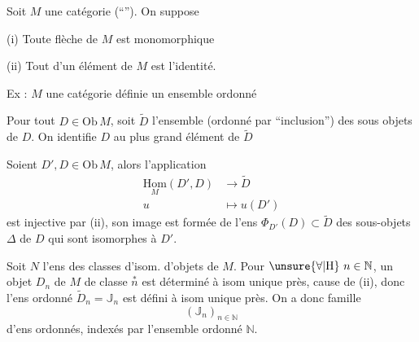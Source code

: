 
Soit \(M\) une catégorie (``''). On suppose

(i) Toute flèche de \(M\) est monomorphique

(ii) Tout  d'un élément de \(M\) est l'identité.

Ex : \(M\) une catégorie définie  un ensemble ordonné

Pour tout \(D\in\mathrm{Ob}\,M\), soit \(\widetilde D\) l'ensemble (ordonné par ``inclusion'') des sous objets de \(D\). On identifie \(D\) au plus grand élément de \(\widetilde D\)

Soient \(D',D\in\mathrm{Ob}\,M\), alors l'application
\begingroup\makeatletter\tagsleft@true\makeatother
\[
\begin{aligned}
\underset{M}{\mathrm{Hom}}(D',D)&\longrightarrow\widetilde D\\
u&\longmapsto u(D')
\end{aligned}
\tag*{(\(\ast\))}
\]
\endgroup
est injective par (ii), son image est formée de l'ens 
\(\Phi_{D'}(D)\subset\widetilde D\)
des sous-objets \(\Delta\) de \(D\) qui sont isomorphes à \(D'\).


Soit \(N\) l'ens  des classes d'isom. d'objets de \(M\). 
Pour \(\unsure{\forall|\mathrm H}\ n\in\mathbb N\), un objet \(D_n\) de \(M\) de classe \(\overset{\ast}{n}\) est déterminé à isom unique près,  cause de (ii), donc l'ens ordonné \(\widetilde D_n=\mathbb J_n\) est défini à isom unique près. On a donc  famille
\[
(\mathbb J_n)_{n\in\mathbb N}
\]
d'ens ordonnés, indexés par l'ensemble ordonné \(\mathbb N\).
